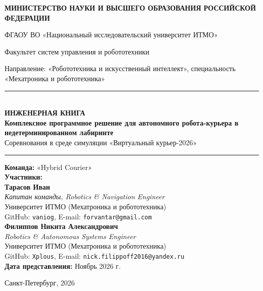 \documentclass[a4paper,11pt]{article}
\begin{document}
\begin{titlepage}
    \centering
    \vspace*{5mm}
    {\large\textbf{МИНИСТЕРСТВО НАУКИ И ВЫСШЕГО ОБРАЗОВАНИЯ РОССИЙСКОЙ ФЕДЕРАЦИИ}\par}
    {\large ФГАОУ ВО «Национальный исследовательский университет ИТМО»\par}
    {\large Факультет систем управления и робототехники\par}
    \vspace{2mm}
    {\small Направление: «Робототехника и искусственный интеллект», специальность «Мехатроника и робототехника»\par}
    \vspace{25mm}
    \rule{\linewidth}{1.5pt}\\[4mm]
    {\huge\bfseries\color{navy_dark} ИНЖЕНЕРНАЯ КНИГА}\\[3mm]
    {\Large\bfseries Комплексное программное решение для автономного робота-курьера в недетерминированном лабиринте}\\[2mm]
    {\large Соревнования в среде симуляции «Виртуальный курьер-2026»}\\[1mm]
    \rule{\linewidth}{1.5pt}
    
    \vspace{35mm}

    \vfill

    \begin{flushright}
    \begin{minipage}{0.65\textwidth}
        \textbf{Команда:} «Hybrid Courier»\\[2mm]
        \textbf{Участники:}\\[1.5mm]
        \textbf{Тарасов Иван} \\
        \textit{Капитан команды, Robotics \& Navigation Engineer}\\
        Университет ИТМО (Мехатроника и робототехника)\\
        GitHub: \texttt{vaniog}, E-mail: \texttt{forvantar@gmail.com}\\[2.5mm]
        \textbf{Филиппов Никита Александрович} \\
        \textit{Robotics \& Autonomous Systems Engineer}\\
        Университет ИТМО (Мехатроника и робототехника)\\
        GitHub: \texttt{Xplous}, E-mail: \texttt{nick.filippoff2016@yandex.ru}\\[3.5mm]
        \textbf{Дата представления:} Ноябрь 2026 г.
    \end{minipage}
    \end{flushright}
    
    \vspace{15mm}
    {\large Санкт-Петербург, 2026}
\end{titlepage}
\end{document}
